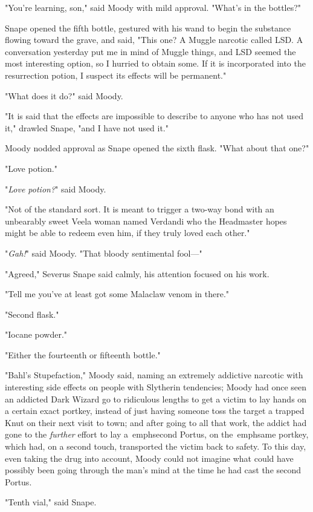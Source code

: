 "You're learning, son," said Moody with mild approval. "What's in the bottles?"

Snape opened the fifth bottle, gestured with his wand to begin the substance 
flowing toward the grave, and said, "This one? A Muggle narcotic called LSD. A 
conversation yesterday put me in mind of Muggle things, and LSD seemed the most 
interesting option, so I hurried to obtain some. If it is incorporated into the 
resurrection potion, I suspect its effects will be permanent."

"What does it do?" said Moody.

"It is said that the effects are impossible to describe to anyone who has not 
used it," drawled Snape, "and I have not used it."

Moody nodded approval as Snape opened the sixth flask. "What about that one?"

"Love potion."

"\emph{Love potion?}" said Moody.

"Not of the standard sort. It is meant to trigger a two-way bond with an 
unbearably sweet Veela woman named Verdandi who the Headmaster hopes might be 
able to redeem even him, if they truly loved each other."

"\emph{Gah!}" said Moody. "That bloody sentimental fool---"

"Agreed," Severus Snape said calmly, his attention focused on his work.

"Tell me you've at least got some Malaclaw venom in there."

"Second flask."

"Iocane powder."

"Either the fourteenth or fifteenth bottle."

"Bahl's Stupefaction," Moody said, naming an extremely addictive narcotic with 
interesting side effects on people with Slytherin tendencies; Moody had once 
seen an addicted Dark Wizard go to ridiculous lengths to get a victim to lay 
hands on a certain exact portkey, instead of just having someone toss the 
target a trapped Knut on their next visit to town; and after going to all that 
work, the addict had gone to the \emph{further} effort to lay a\ emph{second 
Portus,} on the\ emph{same portkey,} which had, on a second touch, transported 
the victim back to safety. To this day, even taking the drug into account, 
Moody could not imagine what could have possibly been going through the man's 
mind at the time he had cast the second Portus.

"Tenth vial," said Snape.

